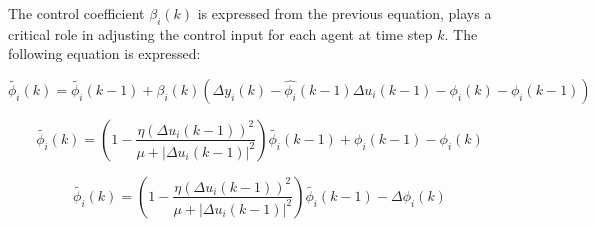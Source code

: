 \documentclass[journal,onecolumn]{IEEEtran}
\begin{document}
The control coefficient \(\beta_i(k)\) is expressed from the previous equation, plays a critical role in adjusting the control input for each agent at time step $k$. The following equation is expressed:

 
\begin{equation}
    \label{model 17}
    \tilde{\phi_i}(k) = \tilde{\phi_i}(k-1)+\beta_i(k)  (\Delta y_i(k) - \hat{\phi_i}(k-1)\Delta u_i(k-1) -\phi_i(k) - \phi_i(k-1))
\end{equation}

\begin{equation}
    \label{model 18}
    \tilde{\phi_i}(k) = (1-\frac{\eta(\Delta u_i(k-1))^2}{\mu + |\Delta u_i(k-1)|^2})\tilde{\phi_i}(k-1) + \phi_i(k-1) - \phi_i(k)
\end{equation}

\begin{equation}
    \label{model 19}
    \tilde{\phi_i}(k) = (1-\frac{\eta(\Delta u_i(k-1))^2}{\mu + |\Delta u_i(k-1)|^2})\tilde{\phi_i}(k-1) - \Delta \phi_i(k)
\end{equation}







\end{document}
